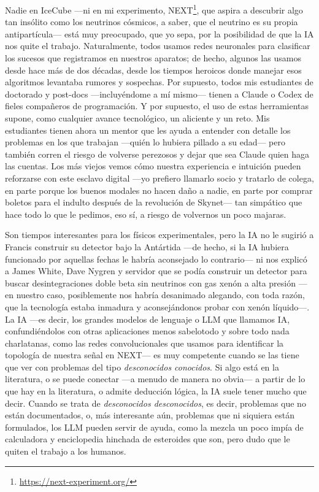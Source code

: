 \documentclass[11pt,a4paper]{article}
\begin{document}
Nadie en IceCube ---ni en mi experimento, NEXT\footnote{\url{https://next-experiment.org/}}, que aspira a descubrir algo tan insólito como los neutrinos cósmicos, a saber, que el neutrino es su propia antipartícula--- está muy preocupado, que yo sepa, por la posibilidad de que la IA nos quite el trabajo. Naturalmente, todos usamos redes neuronales para clasificar los sucesos que registramos en nuestros aparatos; de hecho, algunos las usamos desde hace más de dos décadas, desde los tiempos heroicos donde manejar esos algoritmos levantaba rumores y sospechas. Por supuesto, todos mis estudiantes de doctorado y post-docs ---incluyéndome a mí mismo--- tienen a Claude o Codex de fieles compañeros de programación. Y por supuesto, el uso de estas herramientas supone, como cualquier avance tecnológico, un aliciente y un reto. Mis estudiantes tienen ahora un mentor que les ayuda a entender con detalle los problemas en los que trabajan ---quién lo hubiera pillado a su edad--- pero también corren el riesgo de volverse perezosos y dejar que sea Claude quien haga las cuentas. Los más viejos vemos cómo nuestra experiencia e intuición pueden reforzarse con este esclavo digital ---yo prefiero llamarlo socio y tratarlo de colega, en parte porque los buenos modales no hacen daño a nadie, en parte por comprar boletos para el indulto después de la revolución de Skynet--- tan simpático que hace todo lo que le pedimos, eso sí, a riesgo de volvernos un poco majaras. 

Son tiempos interesantes para los físicos experimentales, pero la IA no le sugirió a Francis construir su detector bajo la Antártida ---de hecho, si la IA hubiera funcionado por aquellas fechas le habría aconsejado lo contrario--- ni nos explicó a James White, Dave Nygren y servidor que se podía construir un detector para buscar desintegraciones doble beta sin neutrinos con gas xenón a alta presión ---en nuestro caso, posiblemente nos habría desanimado alegando, con toda razón, que la tecnología estaba inmadura y aconsejándonos probar con xenón líquido---. La IA ---es decir, los grandes modelos de lenguaje o LLM que llamamos IA, confundiéndolos con otras aplicaciones menos sabelotodo y sobre todo nada charlatanas, como las redes convolucionales que usamos para identificar la topología de nuestra señal en NEXT--- es muy competente cuando se las tiene que ver con problemas del tipo \emph{desconocidos conocidos}. Si algo está en la literatura, o se puede conectar ---a menudo de manera no obvia--- a partir de lo que hay en la literatura, o admite deducción lógica, la IA suele tener mucho que decir. Cuando se trata de \emph{desconocidos desconocidos}, es decir, problemas que no están documentados, o, más interesante aún, problemas que ni siquiera están formulados, los LLM pueden servir de ayuda, como la mezcla un poco impía de calculadora y enciclopedia hinchada de esteroides que son, pero dudo que le quiten el trabajo a los humanos.
\end{document}
